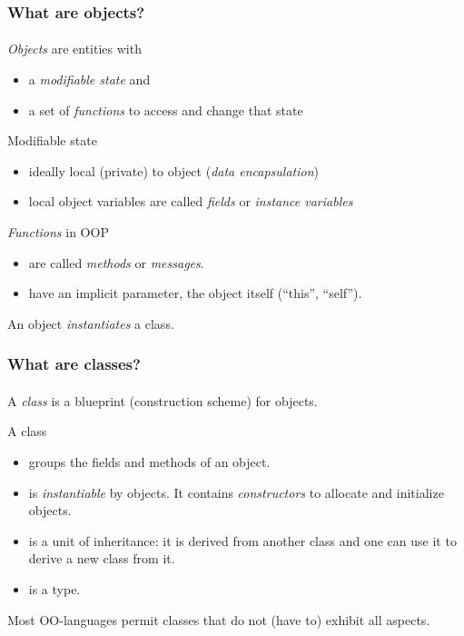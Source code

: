 \documentclass{beamer}
\begin{document}
\begin{frame}[fragile]
\frametitle{What are objects?}
\framesubtitle{}

\emph{Objects} are entities with 
\begin{itemize}
  \item a \emph{modifiable state} and 
  \item a set of \emph{functions} to access and change that state
\end{itemize}

\pause\medskip

Modifiable state 
\begin{itemize}
  \item ideally local (private) to object (\emph{data encapsulation})
  \item local object variables are called \emph{fields} or
    \emph{instance variables} 
\end{itemize}

\pause\medskip

\emph{Functions} in OOP
\begin{itemize}
\item are called \textit{methods} or \textit{messages}.
\item have an implicit parameter, the object itself (``this'', ``self'').
\end{itemize}

\pause\medskip

An object \textit{instantiates} a class.
\end{frame}

\begin{frame}[fragile]
\frametitle{What are classes?}
\framesubtitle{}

A \emph{class} is a blueprint (construction scheme) for objects.

\bigskip

A class

\begin{itemize}
\item groups the fields and methods of an object.
\item is \textit{instantiable} by objects.
It contains \textit{constructors} to allocate and initialize objects.
\item is a unit of inheritance: it is derived from another
class and one can use it to derive a new class from it. 
\item is a type. 
\end{itemize}
\bigskip
Most OO-languages permit classes that do not (have to) exhibit all aspects. 
\end{frame}
\end{document}

